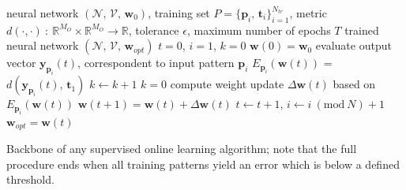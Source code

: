 \documentclass[12pt, a4paper, twoside, openright]{report}
\numberwithin{equation}{chapter}
\theoremstyle{theorem}
\theoremstyle{definition}
\theoremstyle{remark}
\theoremstyle{proposition}
\numberwithin{figure}{chapter}
\newcommand{\Mod}[1]{\ (\mathrm{mod}\ #1)}
\begin{document}
		\begin{algorithm}[t]
			\begin{algorithmic}[1]
				\Require neural network $\left( \mathcal{N}, \, \mathcal{V}, \, \mathbf{w}_0 \right)$, training set $P = \big\lbrace \mathbf{p}_i, \, \mathbf{t}_i \big\rbrace_{i = 1}^{N_{tr}}$, 
				\Statex \hspace*{0.535cm} metric $d(\cdot,\cdot) ~ : ~ \mathbb{R}^{M_O} \times \mathbb{R}^{M_O} \rightarrow \mathbb{R}$, tolerance $\epsilon$, maximum number of epochs $T$
				\Ensure trained neural network $\left( \mathcal{N}, \, \mathcal{V}, \, \mathbf{w}_{opt} \right)$
				\vspace*{0.2cm}
				\State $t = 0$, $i = 1$, $k = 0$
				\State $\mathbf{w}(0) = \mathbf{w}_0$
					\State evaluate output vector $\mathbf{y}_{\mathbf{p}_i}(t)$, correspondent to input pattern $\mathbf{p}_i$
					\State $E_{\mathbf{p}_i}(\mathbf{w}(t))$ = $d(\mathbf{y}_{\mathbf{p}_i}(t), \, \mathbf{t}_1)$
						\State $k \leftarrow k + 1$
					\Else
						\State $k = 0$
						\State compute weight update $\Delta \mathbf{w}(t)$ based on $E_{\mathbf{p}_i}(\mathbf{w}(t))$
						\State $\mathbf{w}(t+1) = \mathbf{w}(t) + \Delta \mathbf{w}(t)$
					\EndIf
					\State $t \leftarrow t+1$, $i \leftarrow i \Mod N + 1$					
				\EndWhile		
				\State $\mathbf{w}_{opt} = \mathbf{w}(t)$
			\end{algorithmic}
			
			\caption{Backbone of any supervised online learning algorithm; note that the full procedure ends when all training patterns yield an error which is below a defined threshold.}
			\label{alg:online-learning}
		\end{algorithm}
\end{document}
